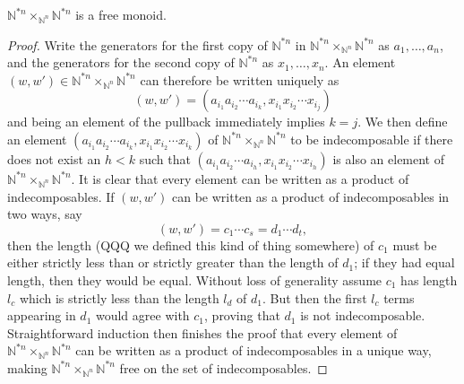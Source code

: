 \documentclass{amsbook} %
\numberwithin{section}{chapter}
\begin{document}
\begin{lem}\label{freemon} $\mathbb{N}^{\ast n} \times_{\mathbb{N}^n} \mathbb{N}^{\ast n}$ is a free monoid.
\end{lem}
\begin{proof}
Write the generators for the first copy of $\mathbb{N}^{\ast n}$ in $\mathbb{N}^{\ast n} \times_{\mathbb{N}^n} \mathbb{N}^{\ast n}$ as $a_1, \ldots, a_n$, and the generators for the second copy of $\mathbb{N}^{\ast n}$ as $x_1, \ldots, x_n$. An element $(w,w') \in \mathbb{N}^{\ast n} \times_{\mathbb{N}^n} \mathbb{N}^{\ast n}$ can therefore be written uniquely as
\[
(w,w') = (a_{i_1} a_{i_2} \cdots a_{i_k}, x_{i_1} x_{i_2} \cdots x_{i_j})
\]
and being an element of the pullback immediately implies $k=j$. We then define an element $ (a_{i_1} a_{i_2} \cdots a_{i_k}, x_{i_1} x_{i_2} \cdots x_{i_k})$ of $\mathbb{N}^{\ast n} \times_{\mathbb{N}^n} \mathbb{N}^{\ast n}$ to be indecomposable if there does not exist an $h < k$ such that $ (a_{i_1} a_{i_2} \cdots a_{i_h}, x_{i_1} x_{i_2} \cdots x_{i_h})$ is also an element of $\mathbb{N}^{\ast n} \times_{\mathbb{N}^n} \mathbb{N}^{\ast n}$. It is clear that every element can be written as a product of indecomposables. If $(w,w')$ can be written as a product of indecomposables in two ways, say 
\[
(w,w') = c_1 \cdots c_s = d_1 \cdots d_t,
\]
then the length (QQQ we defined this kind of thing somewhere) of $c_1$ must be either strictly less than or strictly greater than the length of $d_1$; if they had equal length, then they would be equal. Without loss of generality assume $c_1$ has length $l_c$ which is strictly less than the length $l_d$ of $d_1$. But then the first $l_c$ terms appearing in $d_1$ would agree with $c_1$, proving that $d_1$ is not indecomposable. Straightforward induction then finishes the proof that every element of $\mathbb{N}^{\ast n} \times_{\mathbb{N}^n} \mathbb{N}^{\ast n}$ can be written as a product of indecomposables in a unique way, making $\mathbb{N}^{\ast n} \times_{\mathbb{N}^n} \mathbb{N}^{\ast n}$ free on the set of indecomposables.
\end{proof}
\end{document}
